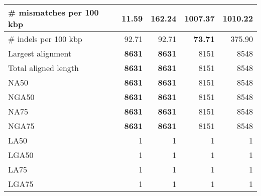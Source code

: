 \documentclass[12pt,a4paper]{article}
\begin{document}
\begin{table}[ht]
\begin{center}
\begin{tabular}{|l*{4}{|r}|}
\# mismatches per 100 kbp & {\bf 11.59} & 162.24 & 1007.37 & 1010.22 \\ \hline
\# indels per 100 kbp & 92.71 & 92.71 & {\bf 73.71} & 375.90 \\ \hline
Largest alignment & {\bf 8631} & {\bf 8631} & 8151 & 8548 \\ \hline
Total aligned length & {\bf 8631} & {\bf 8631} & 8151 & 8548 \\ \hline
NA50 & {\bf 8631} & {\bf 8631} & 8151 & 8548 \\ \hline
NGA50 & {\bf 8631} & {\bf 8631} & 8151 & 8548 \\ \hline
NA75 & {\bf 8631} & {\bf 8631} & 8151 & 8548 \\ \hline
NGA75 & {\bf 8631} & {\bf 8631} & 8151 & 8548 \\ \hline
LA50 & 1 & 1 & 1 & 1 \\ \hline
LGA50 & 1 & 1 & 1 & 1 \\ \hline
LA75 & 1 & 1 & 1 & 1 \\ \hline
LGA75 & 1 & 1 & 1 & 1 \\ \hline
\end{tabular}
\end{center}
\end{table}
\end{document}
